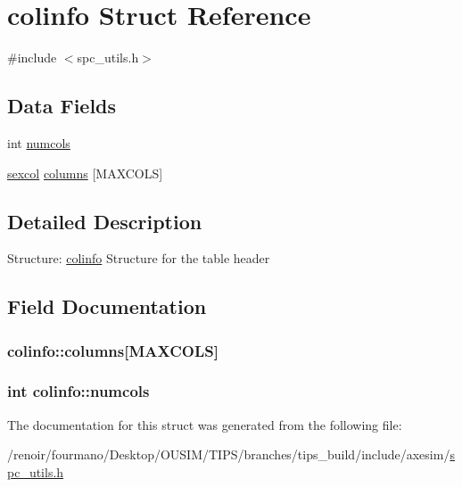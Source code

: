 \hypertarget{structcolinfo}{
\section{colinfo Struct Reference}
\label{structcolinfo}
}


{\ttfamily \#include $<$spc\_\-utils.h$>$}\subsection*{Data Fields}
\begin{DoxyCompactItemize}
\item 
int \hyperlink{structcolinfo_aeac67ce88746e560df5b1f503d26a670}{numcols}
\item 
\hyperlink{structsexcol}{sexcol} \hyperlink{structcolinfo_a001692bf4f745ef0c5066c8ece0f7628}{columns} \mbox{[}MAXCOLS\mbox{]}
\end{DoxyCompactItemize}


\subsection{Detailed Description}
Structure: \hyperlink{structcolinfo}{colinfo} Structure for the table header 

\subsection{Field Documentation}
\hypertarget{structcolinfo_a001692bf4f745ef0c5066c8ece0f7628}{
\subsubsection[{columns}]{ {\bf colinfo::columns}\mbox{[}MAXCOLS\mbox{]}}}
\label{structcolinfo_a001692bf4f745ef0c5066c8ece0f7628}
\hypertarget{structcolinfo_aeac67ce88746e560df5b1f503d26a670}{
\subsubsection[{numcols}]{\setlength{\rightskip}{0pt plus 5cm}int {\bf colinfo::numcols}}}
\label{structcolinfo_aeac67ce88746e560df5b1f503d26a670}


The documentation for this struct was generated from the following file:\begin{DoxyCompactItemize}
\item 
/renoir/fourmano/Desktop/OUSIM/TIPS/branches/tips\_\-build/include/axesim/\hyperlink{spc__utils_8h}{spc\_\-utils.h}\end{DoxyCompactItemize}
